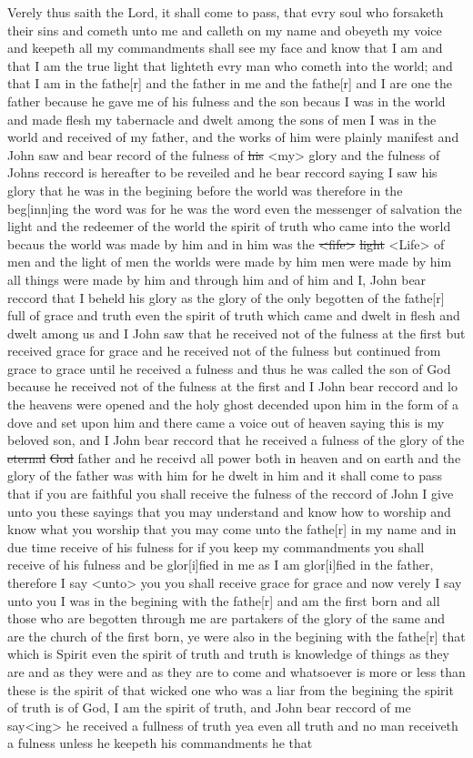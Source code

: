 				Verely thus saith the Lord, it shall come to pass, that evry soul who forsaketh their sins and cometh unto me and calleth on my name and obeyeth my voice and keepeth all my commandments shall see my face and know that I am and that I am the true light that lighteth evry man who cometh into the world; and that I am in the fathe[r] and the father in me and the fathe[r] and I are one the father because he gave me of his fulness and the son becaus I was in the world and made flesh my tabernacle and dwelt among the sons of men I was in the world and received of my father, and the works of him were plainly manifest and John saw and bear record of the fulness of \sout{his} <my> glory and the fulness of Johns reccord is hereafter to be reveiled and he bear reccord saying I saw his glory that he was in the begining before the world was therefore in the beg[inn]ing the word was for he was the word even the messenger of salvation the light and the redeemer of the world the spirit of truth who came into the world becaus the world was made by him and in him was the \sout{<fife>} \sout{light} <Life> of men and the light of men the worlds were made by him men were made by him all things were made by him and through him and of him and I, John bear reccord that I beheld his glory as the glory of the only begotten of the fathe[r] full of grace and truth even the spirit of truth which came and dwelt in flesh and dwelt among us and I John saw that he received not of the fulness at the first but received grace for grace and he received not of the fulness but continued from grace to grace until he received a fulness and thus he was called the son of God because he received not of the fulness at the first and I John bear reccord and lo the heavens were opened and the holy ghost decended upon him in the form of a dove and set upon him and there came a voice out of heaven saying this is my beloved son, and I John bear reccord that he received a fulness of the glory of the \sout{eternal} \sout{God} father and he receivd all power both in heaven and on earth and the glory of the father was with him for he dwelt in him and it shall come to pass that if you are faithful you shall receive the fulness of the reccord of John I give unto you these sayings that you may understand and know how to worship and know what you worship that you may come unto the fathe[r] in my name and in due time receive of his fulness for if you keep my commandments you shall receive of his fulness and be glor[i]fied in me as I am glor[i]fied in the father, therefore I say <unto> you you shall receive grace for grace and now verely I say unto you I was in the begining with the fathe[r] and am the first born and all those who are begotten through me are partakers of the glory of the same and are the church of the first born, ye were also in the begining with the fathe[r] that which is Spirit even the spirit of truth and truth is knowledge of things as they are and as they were and as they are to come and whatsoever is more or less than these is the spirit of that wicked one who was a liar from the begining the spirit of truth is of God, I am the spirit of truth, and John bear reccord of me say<ing> he received a fullness of truth yea even all truth and no man receiveth a fulness unless he keepeth his commandments he that 